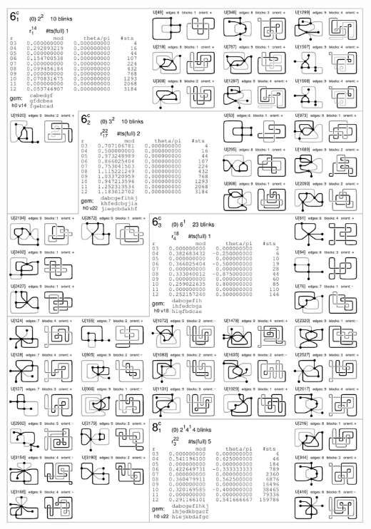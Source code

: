 \begin{center}
 \includegraphics[height=23.5cm]{E.figsbw2/compcatalog001_bw.pdf} \eject

\end{center}

